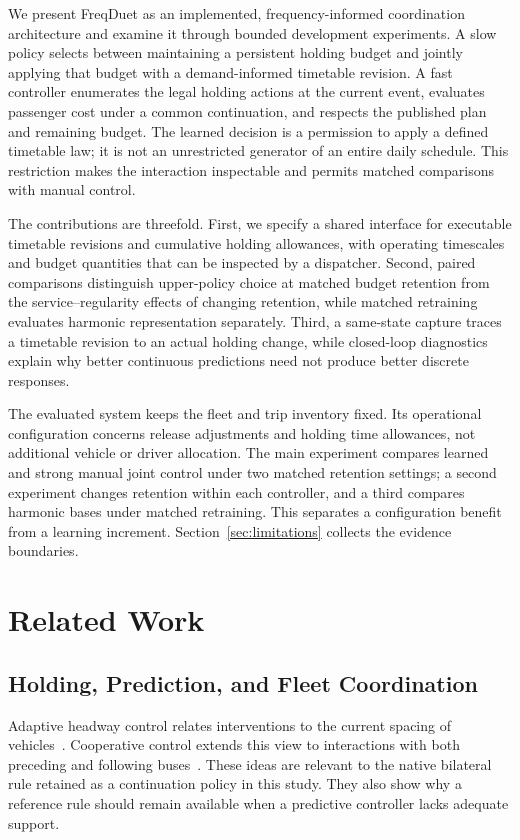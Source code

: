 We present FreqDuet as an implemented, frequency-informed coordination architecture and examine it through bounded development experiments. A slow policy selects between maintaining a persistent holding budget and jointly applying that budget with a demand-informed timetable revision. A fast controller enumerates the legal holding actions at the current event, evaluates passenger cost under a common continuation, and respects the published plan and remaining budget. The learned decision is a permission to apply a defined timetable law; it is not an unrestricted generator of an entire daily schedule. This restriction makes the interaction inspectable and permits matched comparisons with manual control.

The contributions are threefold. First, we specify a shared interface for executable timetable revisions and cumulative holding allowances, with operating timescales and budget quantities that can be inspected by a dispatcher. Second, paired comparisons distinguish upper-policy choice at matched budget retention from the service--regularity effects of changing retention, while matched retraining evaluates harmonic representation separately. Third, a same-state capture traces a timetable revision to an actual holding change, while closed-loop diagnostics explain why better continuous predictions need not produce better discrete responses.

The evaluated system keeps the fleet and trip inventory fixed. Its operational configuration concerns release adjustments and holding time allowances, not additional vehicle or driver allocation. The main experiment compares learned and strong manual joint control under two matched retention settings; a second experiment changes retention within each controller, and a third compares harmonic bases under matched retraining. This separates a configuration benefit from a learning increment. Section~\ref{sec:limitations} collects the evidence boundaries.

\section{Related Work}
\subsection{Holding, Prediction, and Fleet Coordination}
Adaptive headway control relates interventions to the current spacing of vehicles~\cite{daganzo2009headway}. Cooperative control extends this view to interactions with both preceding and following buses~\cite{daganzo2011cooperation}. These ideas are relevant to the native bilateral rule retained as a continuation policy in this study. They also show why a reference rule should remain available when a predictive controller lacks adequate support.

